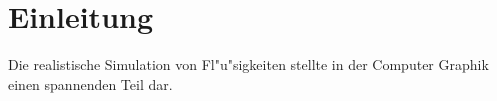\section{Einleitung}
\label{sec:einleitung}

Die realistische Simulation von Fl"u"sigkeiten stellte in der %
Computer Graphik einen spannenden Teil dar. 

